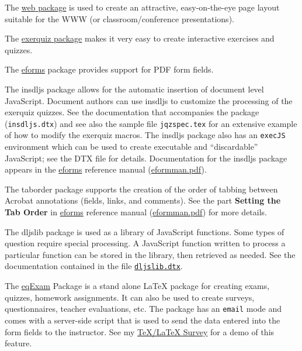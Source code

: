 \documentclass{article}
\def\bUrl{http://www.math.uakron.edu/~dpstory}
\begin{document}
\begin{questions}

\item The \hyperref[s:web]{\textsf{web} package} is used to create an attractive, easy-on-the-eye page layout suitable for the \textsf{WWW} (or classroom/conference presentations).
\item  The \hyperref[s:exerquiz]{\textsf{exerquiz} package} makes
    it very easy to create interactive exercises and quizzes.
\item The \href{eformman.pdf}{eforms} package provides support for
    PDF form fields.
\item The \textsf{insdljs} package allows for the automatic
    insertion of document level JavaScript. Document authors can use
    \textsf{insdljs} to customize the processing of the
    \textsf{exerquiz} quizzes.  See the documentation that accompanies
    the package (\texttt{insdljs.dtx}) and see also the sample file
    \texttt{jqzspec.tex} for an extensive example of how to modify the
    \textsf{exerquiz} macros. The \textsf{insdljs} package also has an
    \texttt{execJS} environment which can be used to create executable
    and ``discardable'' JavaScript; see the DTX file for
    details.
    Documentation for the \textsf{insdljs} package appears in the
    \href{eformman.pdf}{eforms} reference manual
    (\href{\bUrl/eformman.pdf}{eformman.pdf}).
\item The \textsf{taborder} package supports the creation of the order
    of tabbing between Acrobat annotations (fields, links, and comments).
    See the part \textbf{Setting the Tab Order} in \href{eformman.pdf}{eforms}
    reference manual (\href{\bUrl/eformman.pdf}{eformman.pdf}) for more details.
\item The \textsf{dljslib} package is used as a library of
    JavaScript functions.  Some types of question require special
    processing. A JavaScript function written to process a
    particular function can be stored in the library, then
    retrieved as needed.  See the documentation contained in the
    file \texttt{\href{\bUrl/dljslib.dtx}{dljslib.dtx}}.%
\item The \textsf{\href{\bUrl/eqexam.html}{eqExam}} Package is a
    stand alone {\LaTeX} package for creating exams, quizzes, homework
    assignments. It can also be used to create surveys, questionnaires,
    teach\-er evaluations, etc. The package has an \texttt{email} mode and
    comes with a server-side script that is used to send the data entered
    into the form fields to the instructor. See my
    \textsf{\href{\bUrl/eqExam/tex_survey.pdf}{\TeX/\LaTeX{} Survey}} for
    a demo of this feature.
\end{questions}
\end{document}
